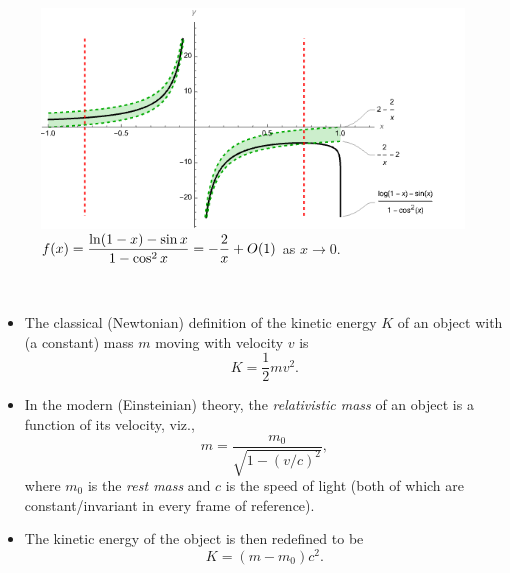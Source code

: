 \begin{figure}[H]
\includegraphics[width=6.5in]{img/power_series_and_limits2}
\caption{$f(x) =\displaystyle\frac{\ln(1-x)-\sin x}{1-\cos^2 x} = -\frac{2}{x} + O(1)$ as $x\to 0$.}
\end{figure}

\newpage

\begin{remark}\,
\begin{itemize}
\item The classical (Newtonian) definition of the kinetic energy $K$ of an object with (a constant) mass $m$ moving with velocity $v$ is
\begin{equation*}
K= \frac{1}{2}mv^2.
\end{equation*}
\item In the modern (Einsteinian) theory, the \textit{relativistic mass} of an object is a function of its velocity, viz.,
\begin{equation*}
m = \frac{m_0}{\sqrt{1-(v/c)^2}},
\end{equation*}
where $m_0$ is the \textit{rest mass} and $c$ is the speed of light (both of which are constant/invariant in every frame of reference).
\item The kinetic energy of the object is then redefined to be
\begin{equation*}
K = (m-m_0)c^2.
\end{equation*}
\end{itemize}
\end{remark}

